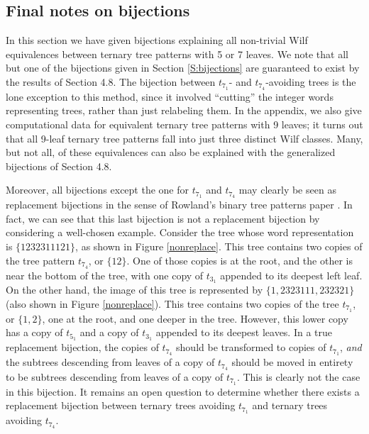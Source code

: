 \documentclass[12pt]{article}
\begin{document}
\subsection{Final notes on bijections}

In this section we have given bijections explaining all non-trivial Wilf equivalences between ternary tree patterns with 5 or 7 leaves.  We note that all but one of the bijections given in Section \ref{S:bijections} are guaranteed to exist by the results of Section 4.8.  The bijection between $t_{7_1}$- and $t_{7_4}$-avoiding trees is the lone exception to this method, since it involved ``cutting'' the integer words representing trees, rather than just relabeling them. In the appendix, we also give computational data for equivalent ternary tree patterns with 9 leaves; it turns out that all 9-leaf ternary tree patterns fall into just three distinct Wilf classes.  Many, but not all, of these equivalences can also be explained with the generalized bijections of Section 4.8.

Moreover, all bijections except the one for $t_{7_1}$ and $t_{7_4}$ may clearly be seen as replacement bijections in the sense of Rowland's binary tree patterns paper \cite{Rowland10}.  In fact, we can see that this last bijection is not a replacement bijection by considering a well-chosen example.  Consider the tree whose word representation is $\{1232311121\}$, as shown in Figure \ref{nonreplace}. This tree contains two copies of the tree pattern $t_{7_4}$, or $\{12\}$.  One of those copies is at the root, and the other is near the bottom of the tree, with one copy of $t_{3_1}$ appended to its deepest left leaf.  On the other hand, the image of this tree is represented by $\{1,2323111,232321\}$ (also shown in Figure \ref{nonreplace}).  This tree contains two copies of the tree $t_{7_1}$, or $\{1,2\}$, one at the root, and one deeper in the tree.  However, this lower copy has a copy of $t_{5_1}$ and a copy of $t_{3_1}$ appended to its deepest leaves.  In a true replacement bijection, the copies of $t_{7_4}$ should be transformed to copies of $t_{7_1}$, \emph{and} the subtrees descending from leaves of a copy of $t_{7_4}$ should be moved in entirety to be subtrees descending from leaves of a copy of $t_{7_1}$.  This is clearly not the case in this bijection.  It remains an open question to determine whether there exists a replacement bijection between ternary trees avoiding $t_{7_1}$ and ternary trees avoiding $t_{7_4}$.
\end{document}
